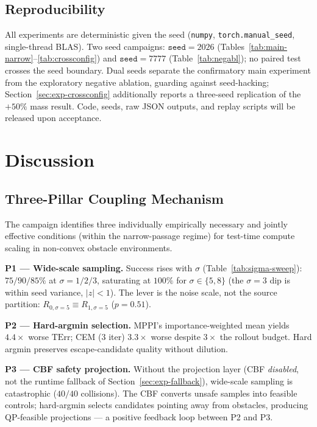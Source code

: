 \documentclass[11pt,onecolumn,a4paper]{article}
\newcommand{\TErr}{\mathrm{TErr}}
\begin{document}
\subsection{Reproducibility}\label{sec:exp-repro}

All experiments are deterministic given the seed (\texttt{numpy},
\texttt{torch.manual\_seed}, single-thread BLAS). Two seed campaigns:
$\texttt{seed} = 2026$ (Tables~\ref{tab:main-narrow}--\ref{tab:crossconfig})
and $\texttt{seed} = 7777$ (Table~\ref{tab:negabl}); no paired test
crosses the seed boundary. Dual seeds separate the confirmatory main
experiment from the exploratory negative ablation, guarding against
seed-hacking; Section~\ref{sec:exp-crossconfig} additionally reports a
three-seed replication of the $+50\%$ mass result. Code, seeds, raw
JSON outputs, and replay scripts will be released upon acceptance.

\section{Discussion}\label{sec:discussion}


\subsection{Three-Pillar Coupling Mechanism}\label{sec:disc-mechanism}

The campaign identifies three individually empirically necessary and
jointly effective conditions (within the narrow-passage regime) for
test-time compute scaling in non-convex obstacle environments.

\textbf{P1 --- Wide-scale sampling.}
Success rises with $\sigma$ (Table~\ref{tab:sigma-sweep}):
$75/90/85\%$ at $\sigma{=}1/2/3$, saturating at $100\%$ for
$\sigma \in \{5, 8\}$ (the $\sigma = 3$ dip is within seed variance,
$|z| < 1$). The lever is the noise scale, not the source partition:
$R_{0,\sigma=5} \equiv R_{1,\sigma=5}$ ($p = 0.51$).

\textbf{P2 --- Hard-argmin selection.}
MPPI's importance-weighted mean yields $4.4\times$ worse $\TErr$;
CEM (3 iter) $3.3\times$ worse despite $3\times$ the rollout budget.
Hard argmin preserves escape-candidate quality without dilution.

\textbf{P3 --- CBF safety projection.}
Without the projection layer (CBF \emph{disabled}, not the runtime
fallback of Section~\ref{sec:exp-fallback}), wide-scale sampling is
catastrophic ($40/40$ collisions). The CBF converts unsafe samples
into feasible controls; hard-argmin selects candidates pointing away
from obstacles, producing QP-feasible projections --- a positive
feedback loop between P2 and P3.
\end{document}
